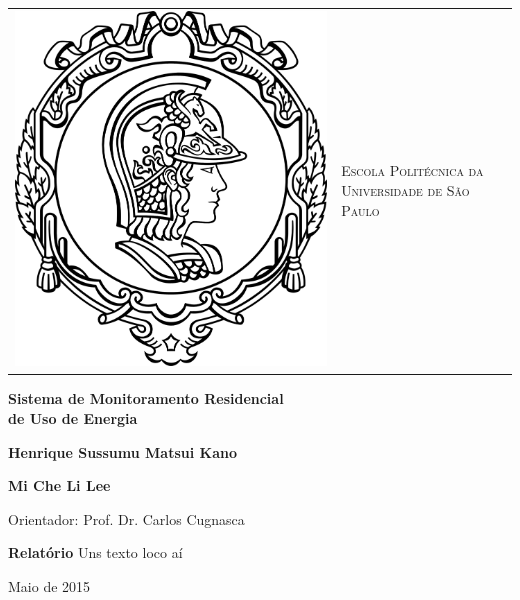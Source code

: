 \begin{titlepage}

\begin{center}

\small

\begin{tabularx}{\linewidth}{ c X }

\parbox[c]{3cm}{\includegraphics[width=\linewidth]{figuras/minerva}} &
\begin{center}
\textsf{\textsc{Escola Politécnica da Universidade de São Paulo
}} 
\end{center}

\end{tabularx}


\vfill

\LARGE

\textbf{Sistema de Monitoramento Residencial\\ 
de Uso de Energia}

\vfill

\large

\textbf{Henrique Sussumu Matsui Kano}

\textbf{Mi Che Li Lee}

\vfill

\normalsize

Orientador: Prof. Dr. Carlos Cugnasca

\vfill

\hfill
\parbox{0.5\linewidth}{\textbf{
Relatório} Uns texto loco aí}


\vfill

\large

Maio de 2015

\end{center}

\end{titlepage}
